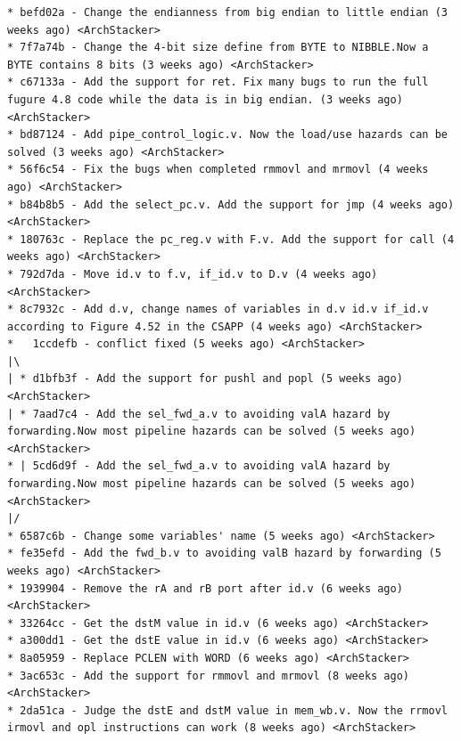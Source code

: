 \begin{verbatim}
* befd02a - Change the endianness from big endian to little endian (3 weeks ago) <ArchStacker>                                                                          
* 7f7a74b - Change the 4-bit size define from BYTE to NIBBLE.Now a BYTE contains 8 bits (3 weeks ago) <ArchStacker>                                                     
* c67133a - Add the support for ret. Fix many bugs to run the full fugure 4.8 code while the data is in big endian. (3 weeks ago) <ArchStacker>                         
* bd87124 - Add pipe_control_logic.v. Now the load/use hazards can be solved (3 weeks ago) <ArchStacker>                                                                
* 56f6c54 - Fix the bugs when completed rmmovl and mrmovl (4 weeks ago) <ArchStacker>                                                                                   
* b84b8b5 - Add the select_pc.v. Add the support for jmp (4 weeks ago) <ArchStacker>                                                                                    
* 180763c - Replace the pc_reg.v with F.v. Add the support for call (4 weeks ago) <ArchStacker>                                                                         
* 792d7da - Move id.v to f.v, if_id.v to D.v (4 weeks ago) <ArchStacker>                                                                                                
* 8c7932c - Add d.v, change names of variables in d.v id.v if_id.v according to Figure 4.52 in the CSAPP (4 weeks ago) <ArchStacker>                                    
*   1ccdefb - conflict fixed (5 weeks ago) <ArchStacker>                                                                                                                
|\  
| * d1bfb3f - Add the support for pushl and popl (5 weeks ago) <ArchStacker>
| * 7aad7c4 - Add the sel_fwd_a.v to avoiding valA hazard by forwarding.Now most pipeline hazards can be solved (5 weeks ago) <ArchStacker>
* | 5cd6d9f - Add the sel_fwd_a.v to avoiding valA hazard by forwarding.Now most pipeline hazards can be solved (5 weeks ago) <ArchStacker>
|/  
* 6587c6b - Change some variables' name (5 weeks ago) <ArchStacker>
* fe35efd - Add the fwd_b.v to avoiding valB hazard by forwarding (5 weeks ago) <ArchStacker>
* 1939904 - Remove the rA and rB port after id.v (6 weeks ago) <ArchStacker>
* 33264cc - Get the dstM value in id.v (6 weeks ago) <ArchStacker>
* a300dd1 - Get the dstE value in id.v (6 weeks ago) <ArchStacker>
* 8a05959 - Replace PCLEN with WORD (6 weeks ago) <ArchStacker>
* 3ac653c - Add the support for rmmovl and mrmovl (8 weeks ago) <ArchStacker>
* 2da51ca - Judge the dstE and dstM value in mem_wb.v. Now the rrmovl irmovl and opl instructions can work (8 weeks ago) <ArchStacker>

\end{verbatim}

